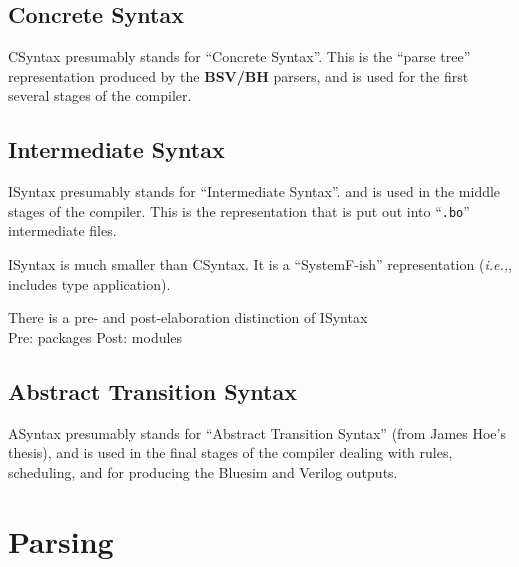\documentclass[11pt]{article}
\newcommand{\hmm}{\hspace*{2em}}
\newcommand{\ie}{\emph{i.e.,}}
\newcommand{\BSVBH}{\bf{BSV/BH}}
\begin{document}

\subsection{Concrete Syntax \hmm {\tt CSyntax}}

\label{sec:CSyntax}

CSyntax presumably stands for ``Concrete Syntax''.  This is the
``parse tree'' representation produced by the {\BSVBH} parsers, and is
used for the first several stages of the compiler.


\subsection{Intermediate Syntax \hmm {\tt ISyntax}}

\label{sec:ISyntax}

ISyntax presumably stands for ``Intermediate Syntax''. and is used in
the middle stages of the compiler.  This is the representation that is
put out into ``{\tt .bo}'' intermediate files.

ISyntax is much smaller than CSyntax. It is a ``SystemF-ish''
representation ({\ie}, includes type application).

There is a pre- and post-elaboration distinction of ISyntax \\
\hmm Pre: packages
\hmm Post: modules


\subsection{Abstract Transition Syntax \hmm {\tt ASyntax}}

\label{sec:ASyntax}

ASyntax presumably stands for ``Abstract Transition Syntax'' (from
James Hoe's thesis), and is used in the final stages of the compiler
dealing with rules, scheduling, and for producing the Bluesim and
Verilog outputs.


\section{Parsing \hmm {\tt Depend::parseFile}}
\end{document}

